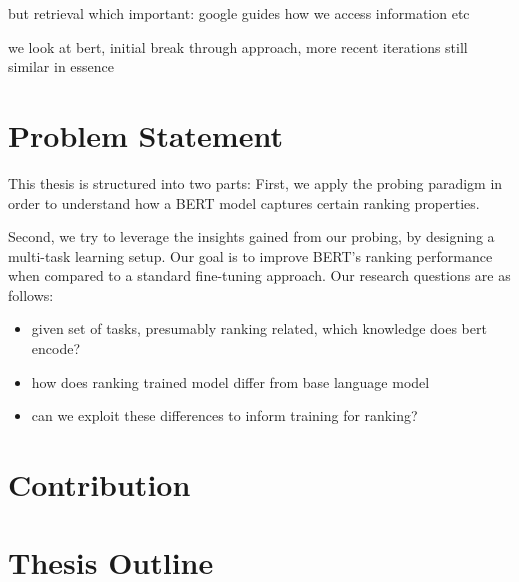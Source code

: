 but retrieval which important: google guides how we access information etc

we look at bert, initial break through approach, more recent iterations still similar in essence

\section{Problem Statement}
This thesis is structured into two parts: First, we apply the probing paradigm in order to understand how a BERT model captures certain ranking properties.

Second, we try to leverage the insights gained from our probing, by designing a multi-task learning setup. Our goal is to improve BERT's ranking performance when compared to a standard fine-tuning approach.
Our research questions are as follows:
\begin{itemize}
    \item given set of tasks, presumably ranking related, which knowledge does bert encode?
    \item how does ranking trained model differ from base language model
    \item can we exploit these differences to inform training for ranking?
\end{itemize}
\section{Contribution}

\section{Thesis Outline}
